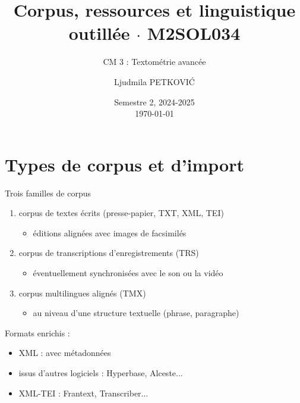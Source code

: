 \documentclass[xetex,xcolor={table,usenames,dvipsnames}]{beamer}
\begin{document}
\title{{\large Corpus, ressources et linguistique outillée $\cdot$ \textsc{M2SOL034}}}
\subtitle{CM 3 : Textométrie avancée}
\author{\footnotesize{Ljudmila PETKOVI\'C}}
\date{\scriptsize{Semestre 2, 2024-2025\\\today}}




	\frame{\titlepage}

\section{Types de corpus et d'import}

\begin{frame}{Trois familles de corpus}
	\begin{enumerate}
		\item corpus de textes écrits (presse-papier, \textsc{TXT}, \textsc{XML}, \textsc{TEI}) 
		\begin{itemize}
			\item éditions alignées avec images de facsimilés
		\end{itemize}
		\item corpus de transcriptions d'enregistrements
		(\textsc{TRS})
		\begin{itemize}
			\item éventuellement synchronisées avec le son
			ou la vidéo
		\end{itemize}
		\item corpus multilingues alignés (\textsc{TMX})
		\begin{itemize}
			\item au niveau
			d'une structure textuelle (phrase, paragraphe)
		\end{itemize}
	\end{enumerate}
		
	Formats enrichis :
	\begin{itemize}
		\item \textsc{XML} : avec métadonnées
		\item issus d'autres logiciels : Hyperbase, Alceste$\dots$
		\item \textsc{XML-TEI} : Frantext, Transcriber$\dots$
	\end{itemize}
\end{frame}
\end{document}
